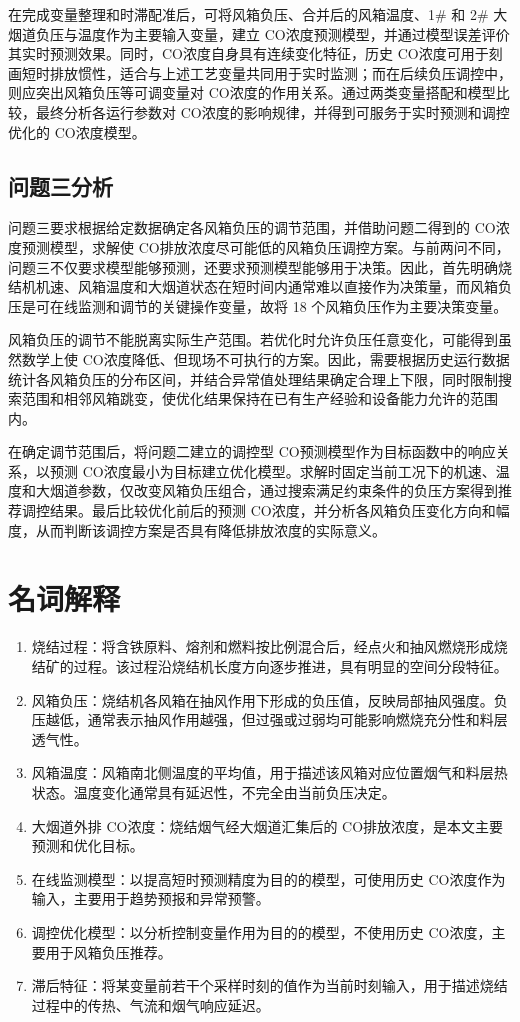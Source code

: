 \documentclass[UTF8,a4paper,zihao=-4]{ctexart}
\newcommand{\CO}{CO}
\begin{document}
在完成变量整理和时滞配准后，可将风箱负压、合并后的风箱温度、1\# 和 2\# 大烟道负压与温度作为主要输入变量，建立 \CO 浓度预测模型，并通过模型误差评价其实时预测效果。同时，\CO 浓度自身具有连续变化特征，历史 \CO 浓度可用于刻画短时排放惯性，适合与上述工艺变量共同用于实时监测；而在后续负压调控中，则应突出风箱负压等可调变量对 \CO 浓度的作用关系。通过两类变量搭配和模型比较，最终分析各运行参数对 \CO 浓度的影响规律，并得到可服务于实时预测和调控优化的 \CO 浓度模型。

\subsection{问题三分析}

问题三要求根据给定数据确定各风箱负压的调节范围，并借助问题二得到的 \CO 浓度预测模型，求解使 \CO 排放浓度尽可能低的风箱负压调控方案。与前两问不同，问题三不仅要求模型能够预测，还要求预测模型能够用于决策。因此，首先明确烧结机机速、风箱温度和大烟道状态在短时间内通常难以直接作为决策量，而风箱负压是可在线监测和调节的关键操作变量，故将 18 个风箱负压作为主要决策变量。

风箱负压的调节不能脱离实际生产范围。若优化时允许负压任意变化，可能得到虽然数学上使 \CO 浓度降低、但现场不可执行的方案。因此，需要根据历史运行数据统计各风箱负压的分布区间，并结合异常值处理结果确定合理上下限，同时限制搜索范围和相邻风箱跳变，使优化结果保持在已有生产经验和设备能力允许的范围内。

在确定调节范围后，将问题二建立的调控型 \CO 预测模型作为目标函数中的响应关系，以预测 \CO 浓度最小为目标建立优化模型。求解时固定当前工况下的机速、温度和大烟道参数，仅改变风箱负压组合，通过搜索满足约束条件的负压方案得到推荐调控结果。最后比较优化前后的预测 \CO 浓度，并分析各风箱负压变化方向和幅度，从而判断该调控方案是否具有降低排放浓度的实际意义。

\section{名词解释}

\begin{enumerate}
  \item 烧结过程：将含铁原料、熔剂和燃料按比例混合后，经点火和抽风燃烧形成烧结矿的过程。该过程沿烧结机长度方向逐步推进，具有明显的空间分段特征。
  \item 风箱负压：烧结机各风箱在抽风作用下形成的负压值，反映局部抽风强度。负压越低，通常表示抽风作用越强，但过强或过弱均可能影响燃烧充分性和料层透气性。
  \item 风箱温度：风箱南北侧温度的平均值，用于描述该风箱对应位置烟气和料层热状态。温度变化通常具有延迟性，不完全由当前负压决定。
  \item 大烟道外排 \CO 浓度：烧结烟气经大烟道汇集后的 \CO 排放浓度，是本文主要预测和优化目标。
  \item 在线监测模型：以提高短时预测精度为目的的模型，可使用历史 \CO 浓度作为输入，主要用于趋势预报和异常预警。
  \item 调控优化模型：以分析控制变量作用为目的的模型，不使用历史 \CO 浓度，主要用于风箱负压推荐。
  \item 滞后特征：将某变量前若干个采样时刻的值作为当前时刻输入，用于描述烧结过程中的传热、气流和烟气响应延迟。
\end{enumerate}
\end{document}
